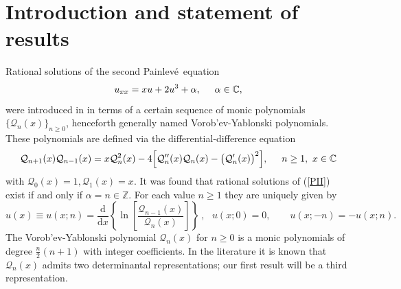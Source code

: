 \documentclass[10pt,oneside,reqno]{amsart}
\numberwithin{equation}{section}
\renewcommand{\d}{{\mathrm d}}
\def\be{\begin{equation}}
\def\ee{\end{equation}}
\def\eqref#1{(\ref{#1})}
\begin{document}
\section{Introduction and statement of results}\label{math-intro}

Rational solutions of the second Painlev\'e\ equation 
\be\label{PII}
  u_{xx}=xu+2u^3+\alpha,\hspace{0.5cm}\alpha\in\mathbb{C},
\ee
were introduced in \cite{V,Y}  in terms of a certain sequence of monic polynomials $\{\mathcal{Q}_n(x)\}_{n\geq 0}$, henceforth generally named Vorob'ev-Yablonski polynomials. These polynomials
are defined via the differential-difference equation
\be
  \mathcal{Q}_{n+1}(x)\mathcal{Q}_{n-1}(x) = x\mathcal{Q}_n^2(x)-4\Big[\mathcal{Q}_n''(x)\mathcal{Q}_n(x)-\big(\mathcal{Q}_n'(x)\big)^2\Big],\hspace{0.5cm}n\geq 1,
  \ x\in\mathbb{C}\nonumber
\ee
with $\mathcal{Q}_0(x)=1,\mathcal{Q}_1(x)=x$.
It was found that rational solutions of \eqref{PII} exist if and only if $\alpha=n\in\mathbb{Z}$. For each value $n\geq 1$  they are uniquely given by
\begin{equation}\label{VoYa}
  u(x)\equiv u(x;n) = \frac{\d}{\d x}\left\{\ln\left[\frac{\mathcal{Q}_{n-1}(x)}{\mathcal{Q}_n(x)}\right]\right\}\ ,\ \ \ 
  u(x;0) = 0,\qquad u(x;-n) = -u(x;n). 
\end{equation}
The Vorob'ev-Yablonski polynomial $\mathcal{Q}_n(x)$ for $n\geq 0$ is a monic polynomials of degree $\frac{n}{2}(n+1)$ with integer coefficients.
In the literature it is known \cite{KO} that $\mathcal{Q}_n(x)$ admits two determinantal representations; our first result will be a third representation.\smallskip
\end{document}
